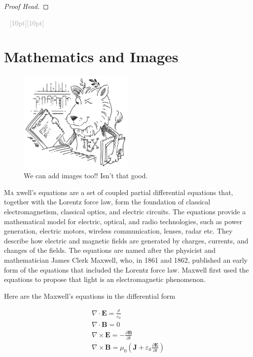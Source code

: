 \documentclass{package/notes}
\newcommand{\ornamento}{\vspace{2em}\noindent \textcolor{darkgray}{\hrulefill~ \raisebox{-2.5pt}[10pt][10pt]{\leafright \decofourleft 
\decothreeleft  \aldineright \decotwo \floweroneleft \decoone   \floweroneright 
\decotwo \aldineleft\decothreeright \decofourright \leafleft} ~  \hrulefill \\ \vspace{2em}}}
\begin{document}
\begin{problem}%
	\lipsum[1][1-3] %
\end{problem}
\begin{proof}[Proof Head]
	\lipsum[1][1-10] %
\end{proof}
\nocite{knuthwebsite}

\ornamento

\section{Mathematics and Images}
\begin{figure}[H]
	\centering
	\includegraphics[height = 0.4\textwidth, width = 0.5\textwidth]{resource/ctan_lion.png}
	\caption{We can add images too!! Isn't that good.}
	\label{img:anything}
\end{figure}
\lettrine{M}{a} xwell's equations are a set of coupled partial differential equations that, together with the Lorentz force law, form the foundation of classical electromagnetism, 
classical optics, and electric circuits. The equations provide a mathematical model for electric, optical, and radio technologies, 
such as power generation, electric motors, wireless communication, lenses, radar etc. They describe how electric and magnetic fields are generated by charges, currents, and changes of the fields.
The equations are named after the physicist and mathematician James Clerk Maxwell, who, in 1861 and 1862, published an early form of the equations that included 
  the Lorentz force law. Maxwell first used the equations to propose that light is an electromagnetic phenomenon. 

  Here are the Maxwell's equations in the differential form

\[
\begin{gathered}
	\nabla \cdot \mathbf {E} ={\frac {\rho }{\varepsilon _{0}}} \\
	 \nabla \cdot \mathbf {B} ={0} \\ \tag*{(1)}
	\nabla \times \mathbf {E} =-{\frac {\partial \mathbf {B} }{\partial t}}\\
	 \nabla \times \mathbf {B} =\mu _{0}\left(\mathbf {J} +\varepsilon _{0}{\frac {\partial \mathbf {E} }{\partial t}}\right)
\end{gathered}
\]
\vspace*{2pt}
\lipsum[1][1-20]

\pagebreak

\medskip

\printbibliography[heading=bibintoc,title={\centering Bibliography}]
\end{document}
